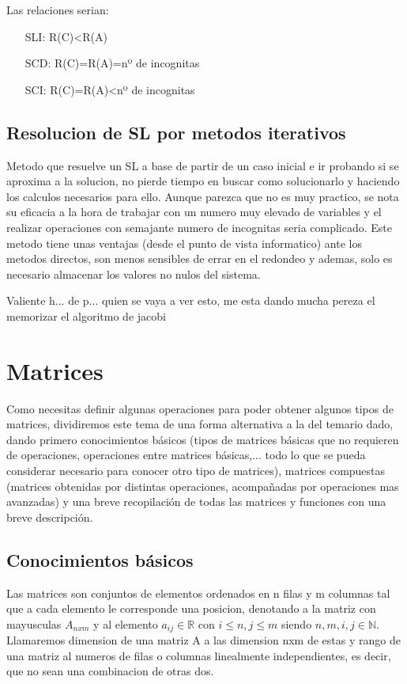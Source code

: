 \documentclass[11pt,a4paper]{article}
\begin{document}
Las relaciones serian:
\begin{enumerate}
\item[SLI:] R(C)<R(A)
\item[SCD:] R(C)=R(A)=nº de incognitas
\item[SCI:] R(C)=R(A)<nº de incognitas
\end{enumerate}


\subsection{Resolucion de SL por metodos iterativos}

Metodo que resuelve un SL a base de partir de un caso inicial e ir probando si se aproxima a la solucion, no pierde tiempo en buscar como solucionarlo y haciendo los calculos necesarios para ello. Aunque parezca que no es muy practico, se nota su eficacia a la hora de trabajar con un numero muy elevado de variables y el realizar operaciones con semajante numero de incognitas seria complicado. Este metodo tiene unas ventajas (desde el punto de vista informatico) ante los metodos directos, son menos sensibles de errar en el redondeo y ademas, solo es necesario almacenar los valores no nulos del sistema.

Valiente h... de p... quien se vaya a ver esto, me esta dando mucha pereza el memorizar el algoritmo de jacobi

\section{Matrices}

Como necesitas definir algunas operaciones para poder obtener algunos tipos de matrices, dividiremos este tema de una forma alternativa a la del temario dado, dando primero conocimientos básicos (tipos de matrices básicas que no requieren de operaciones, operaciones entre matrices básicas,... todo lo que se pueda considerar necesario para conocer otro tipo de matrices), matrices compuestas (matrices obtenidas por distintas operaciones, acompañadas por operaciones mas avanzadas) y una breve recopilación de todas las matrices y funciones con una breve descripción.

\subsection{Conocimientos básicos}
Las matrices son conjuntos de elementos ordenados en n filas y m columnas tal que a cada elemento le corresponde una posicion, denotando a la matriz con mayusculas $A_{nxm}$ y al elemento $a_{ij}\in \mathbb{R}$ con $i\leq n,j\leq m$ siendo $n,m,i,j\in \mathbb{N}$. Llamaremos dimension de una matriz A a las dimension nxm de estas y rango de una matriz al numeros de filas o columnas linealmente independientes, es decir, que no sean una combinacion de otras dos.
\end{document}
